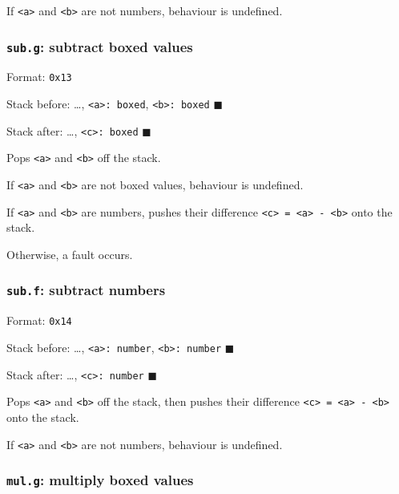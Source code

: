If \texttt{\textless{}a\textgreater{}} and
\texttt{\textless{}b\textgreater{}} are not numbers, behaviour is
undefined.

\subsubsection{\texorpdfstring{\texttt{sub.g}: subtract boxed
values}{sub.g: subtract boxed values}}

Format: \texttt{0x13}

Stack before: \ldots, \texttt{\textless{}a\textgreater{}:\ boxed},
\texttt{\textless{}b\textgreater{}:\ boxed} \(\blacksquare\)

Stack after: \ldots, \texttt{\textless{}c\textgreater{}:\ boxed}
\(\blacksquare\)

Pops \texttt{\textless{}a\textgreater{}} and
\texttt{\textless{}b\textgreater{}} off the stack.

If \texttt{\textless{}a\textgreater{}} and
\texttt{\textless{}b\textgreater{}} are not boxed values, behaviour is
undefined.

If \texttt{\textless{}a\textgreater{}} and
\texttt{\textless{}b\textgreater{}} are numbers, pushes their difference
\texttt{\textless{}c\textgreater{}\ =\ \textless{}a\textgreater{}\ -\ \textless{}b\textgreater{}}
onto the stack.

Otherwise, a fault occurs.

\subsubsection{\texorpdfstring{\texttt{sub.f}: subtract
numbers}{sub.f: subtract numbers}}

Format: \texttt{0x14}

Stack before: \ldots, \texttt{\textless{}a\textgreater{}:\ number},
\texttt{\textless{}b\textgreater{}:\ number} \(\blacksquare\)

Stack after: \ldots, \texttt{\textless{}c\textgreater{}:\ number}
\(\blacksquare\)

Pops \texttt{\textless{}a\textgreater{}} and
\texttt{\textless{}b\textgreater{}} off the stack, then pushes their
difference
\texttt{\textless{}c\textgreater{}\ =\ \textless{}a\textgreater{}\ -\ \textless{}b\textgreater{}}
onto the stack.

If \texttt{\textless{}a\textgreater{}} and
\texttt{\textless{}b\textgreater{}} are not numbers, behaviour is
undefined.

\subsubsection{\texorpdfstring{\texttt{mul.g}: multiply boxed
values}{mul.g: multiply boxed values}}

